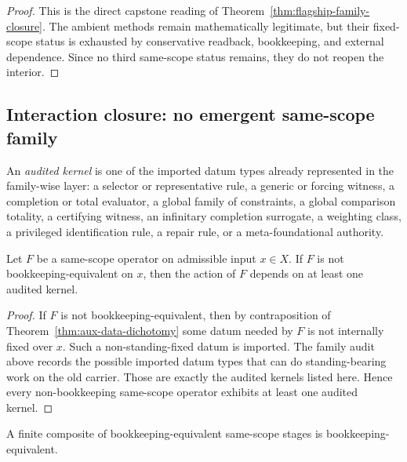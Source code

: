 \begin{proof}
This is the direct capstone reading of Theorem~\ref{thm:flagship-family-closure}. The ambient methods remain mathematically legitimate, but their fixed-scope status is exhausted by conservative readback, bookkeeping, and external dependence. Since no third same-scope status remains, they do not reopen the interior.
\end{proof}

\subsection{Interaction closure: no emergent same-scope family}

\begin{definition}
An \emph{audited kernel} is one of the imported datum types already represented in the family-wise layer: a selector or representative rule, a generic or forcing witness, a completion or total evaluator, a global family of constraints, a global comparison totality, a certifying witness, an infinitary completion surrogate, a weighting class, a privileged identification rule, a repair rule, or a meta-foundational authority.
\end{definition}

\begin{lemma}
\label{lem:kernel-provenance}
Let $F$ be a same-scope operator on admissible input $x\in X$. If $F$ is not bookkeeping-equivalent on $x$, then the action of $F$ depends on at least one audited kernel.
\end{lemma}

\begin{proof}
If $F$ is not bookkeeping-equivalent, then by contraposition of Theorem~\ref{thm:aux-data-dichotomy} some datum needed by $F$ is not internally fixed over $x$. Such a non-standing-fixed datum is imported. The family audit above records the possible imported datum types that can do standing-bearing work on the old carrier. Those are exactly the audited kernels listed here. Hence every non-bookkeeping same-scope operator exhibits at least one audited kernel.
\end{proof}

\begin{lemma}
\label{lem:bookkeeping-stable-under-finite-composition}
A finite composite of bookkeeping-equivalent same-scope stages is bookkeeping-equivalent.
\end{lemma}

